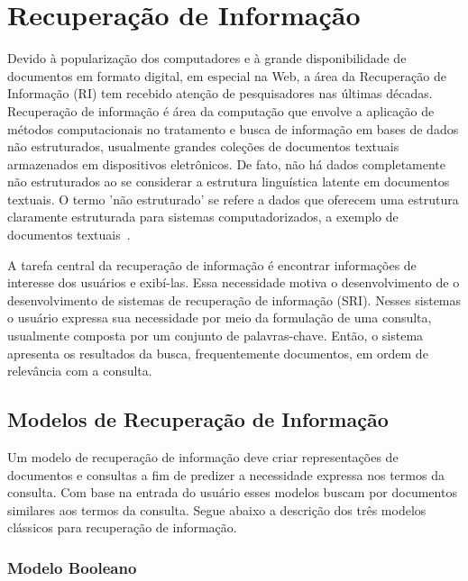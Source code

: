 
\section{Recuperação de Informação}


Devido à popularização dos computadores e à grande disponibilidade de documentos em formato digital, em especial na Web, a área da Recuperação de Informação (RI) tem recebido atenção de pesquisadores nas últimas décadas. Recuperação de informação é área da computação que envolve a aplicação de métodos computacionais no tratamento e busca de informação em bases de dados não estruturados, usualmente grandes coleções de documentos textuais armazenados em dispositivos eletrônicos. De fato, não há dados completamente não estruturados ao se considerar a estrutura linguística latente em documentos textuais. O termo 'não estruturado' se refere a dados que oferecem uma estrutura claramente estruturada para sistemas computadorizados, a exemplo de documentos 
textuais~\cite{Manning2008}.


A tarefa central da recuperação de informação é encontrar informações de interesse dos usuários e exibí-las. Essa necessidade motiva o desenvolvimento de o desenvolvimento de sistemas de recuperação de informação (SRI). Nesses sistemas o usuário expressa sua necessidade por meio da formulação de uma consulta, usualmente composta por um conjunto de palavras-chave. Então, o sistema apresenta os resultados da busca, frequentemente documentos, em ordem de relevância com a consulta.  %


\subsection{Modelos de Recuperação de Informação}

Um modelo de recuperação de informação deve criar representações de documentos e consultas a fim de predizer a necessidade expressa nos termos da consulta. Com base na entrada do usuário esses modelos buscam por documentos similares aos termos da consulta. Segue abaixo a descrição dos três modelos clássicos para recuperação de informação.

\subsubsection{Modelo Booleano}

